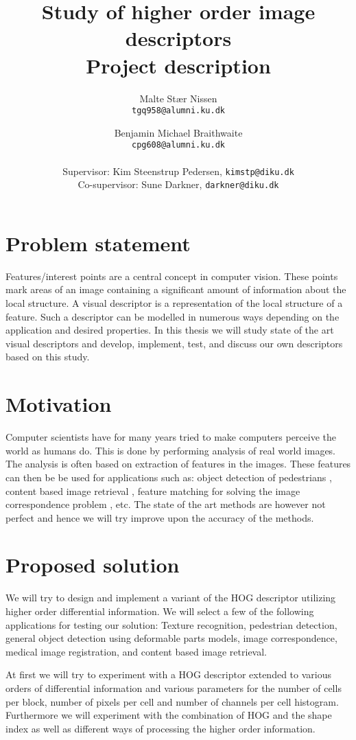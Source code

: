 \documentclass[11pt,a4paper]{article}
\title{\bfseries{Study of higher order image descriptors}\\Project description}
\author{
    Malte Stær Nissen \\\texttt{tgq958@alumni.ku.dk}
    \and
    Benjamin Michael Braithwaite \\ \texttt{cpg608@alumni.ku.dk}
    \\
    \\ \small{Supervisor: Kim Steenstrup Pedersen, \texttt{kimstp@diku.dk}}
    \\ \small{Co-supervisor: Sune Darkner, \texttt{darkner@diku.dk}}
    }
\begin{document}
\maketitle

\section{Problem statement}
Features/interest points are a central concept in computer vision. These
points mark areas of an image containing a significant amount of information
about the local structure. A visual descriptor is a representation of the
local structure of a feature. Such a descriptor can be modelled in numerous
ways depending on the application and desired properties. In this thesis we
will study state of the art visual descriptors and develop, implement, test,
and discuss our own descriptors based on this study.

\section{Motivation}
Computer scientists have for many years tried to make computers perceive the
world as humans do. This is done by performing analysis of real world images.
The analysis is often based on extraction of features in the images. These
features can then be be used for applications such as: object detection of
pedestrians \cite{felzenszwalb2008discriminatively},
content based image retrieval \cite{smeulders2000content},
feature matching for solving the image correspondence problem
\cite{dahl2011finding}, etc.
The state of the art methods are however
not perfect and hence we will try improve upon the accuracy of the methods.

\section{Proposed solution}
We will try to design and implement a variant of the HOG descriptor utilizing
higher order differential information. We
will select a few of the following applications for testing our solution:
Texture recognition, pedestrian detection, general object detection using
deformable parts models, image correspondence, medical image registration, and
content based image retrieval.

At first we will try to experiment with a HOG descriptor extended to various orders
of differential information and various parameters for the number of cells per
block, number of pixels per cell and number of channels per cell histogram.
Furthermore we will experiment with the combination of HOG and the shape index
\cite{koenderink1992surface}
as well as different ways of processing the higher order information.
\end{document}
